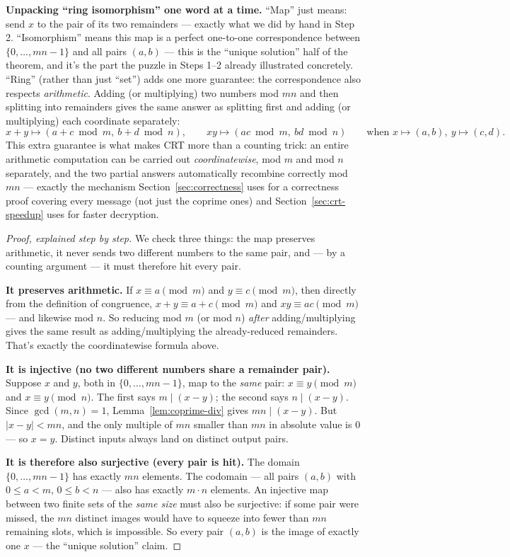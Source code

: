 \documentclass[11pt]{article}
\theoremstyle{definition}
\theoremstyle{remark}
\begin{document}
\medskip\noindent\textbf{Unpacking ``ring isomorphism'' one word at a time.} ``Map'' just means: send $x$ to the pair of its two remainders --- exactly what we did by hand in Step 2. ``Isomorphism'' means this map is a perfect one-to-one correspondence between $\{0,\dots,mn-1\}$ and all pairs $(a,b)$ --- this is the ``unique solution'' half of the theorem, and it's the part the puzzle in Steps 1--2 already illustrated concretely. ``Ring'' (rather than just ``set'') adds one more guarantee: the correspondence also respects \emph{arithmetic}. Adding (or multiplying) two numbers mod $mn$ and then splitting into remainders gives the same answer as splitting first and adding (or multiplying) each coordinate separately:
\[
x+y \mapsto (a+c \bmod m,\ b+d \bmod n), \qquad xy \mapsto (ac \bmod m,\ bd \bmod n) \qquad \text{when } x\mapsto(a,b),\ y\mapsto(c,d).
\]
This extra guarantee is what makes CRT more than a counting trick: an entire arithmetic computation can be carried out \emph{coordinatewise}, mod $m$ and mod $n$ separately, and the two partial answers automatically recombine correctly mod $mn$ --- exactly the mechanism Section~\ref{sec:correctness} uses for a correctness proof covering every message (not just the coprime ones) and Section~\ref{sec:crt-speedup} uses for faster decryption.

\begin{proof}[Proof, explained step by step]
We check three things: the map preserves arithmetic, it never sends two different numbers to the same pair, and --- by a counting argument --- it must therefore hit every pair.

\textbf{It preserves arithmetic.} If $x\equiv a\pmod m$ and $y\equiv c\pmod m$, then directly from the definition of congruence, $x+y\equiv a+c\pmod m$ and $xy\equiv ac\pmod m$ --- and likewise mod $n$. So reducing mod $m$ (or mod $n$) \emph{after} adding/multiplying gives the same result as adding/multiplying the already-reduced remainders. That's exactly the coordinatewise formula above.

\textbf{It is injective (no two different numbers share a remainder pair).} Suppose $x$ and $y$, both in $\{0,\dots,mn-1\}$, map to the \emph{same} pair: $x\equiv y\pmod m$ and $x\equiv y\pmod n$. The first says $m\mid(x-y)$; the second says $n\mid(x-y)$. Since $\gcd(m,n)=1$, Lemma~\ref{lem:coprime-div} gives $mn\mid(x-y)$. But $|x-y|<mn$, and the only multiple of $mn$ smaller than $mn$ in absolute value is $0$ --- so $x=y$. Distinct inputs always land on distinct output pairs.

\textbf{It is therefore also surjective (every pair is hit).} The domain $\{0,\dots,mn-1\}$ has exactly $mn$ elements. The codomain --- all pairs $(a,b)$ with $0\le a<m,\,0\le b<n$ --- also has exactly $m\cdot n$ elements. An injective map between two finite sets of the \emph{same size} must also be surjective: if some pair were missed, the $mn$ distinct images would have to squeeze into fewer than $mn$ remaining slots, which is impossible. So every pair $(a,b)$ is the image of exactly one $x$ --- the ``unique solution'' claim.
\end{proof}
\end{document}
